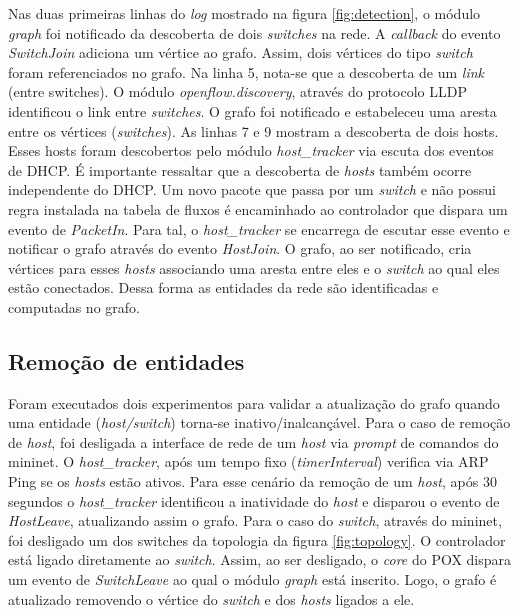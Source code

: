 Nas duas primeiras linhas do \emph{log} mostrado na figura
\ref{fig:detection}, o módulo \emph{graph} foi notificado
da descoberta de dois \emph{switches} na rede.
A \emph{callback} do evento \emph{SwitchJoin} adiciona um vértice ao grafo. 
Assim, dois vértices do tipo \emph{switch} foram referenciados no grafo. 
Na linha 5, nota-se que a descoberta de um \emph{link} (entre switches).
O módulo \emph{openflow.discovery}, através do protocolo LLDP identificou 
o link entre \emph{switches}.
O grafo foi notificado e estabeleceu uma aresta entre os 
vértices (\emph{switches}).
As linhas 7 e 9 mostram a descoberta de dois hosts. 
Esses hosts foram descobertos pelo módulo \emph{host\_tracker} via 
escuta dos eventos de DHCP.
É importante ressaltar que a descoberta de \emph{hosts} também ocorre 
independente do DHCP.
Um novo pacote que passa por um \emph{switch} e não possui regra
instalada na tabela de fluxos é encaminhado ao controlador que 
dispara um evento de \emph{PacketIn}. 
Para tal, o \emph{host\_tracker} se encarrega de escutar esse evento 
e notificar o grafo através do evento \emph{HostJoin}.
O grafo, ao ser notificado, cria vértices para esses \emph{hosts} associando uma
aresta entre eles e o \emph{switch} ao qual eles estão conectados.
Dessa forma as entidades da rede são identificadas e computadas no grafo.

\subsection{Remoção de entidades}
Foram executados dois experimentos para validar a atualização do grafo
quando uma entidade (\emph{host/switch}) torna-se inativo/inalcançável.
Para o caso de remoção de \emph{host}, foi desligada a interface de 
rede de um \emph{host} via \emph{prompt} de comandos do mininet. 
O \emph{host\_tracker}, após um tempo fixo (\emph{timerInterval}) 
verifica via ARP Ping se os \emph{hosts} estão ativos.
Para esse cenário da remoção de um \emph{host}, após 30 segundos o 
\emph{host\_tracker} identificou a inatividade do \emph{host} e 
disparou o evento de \emph{HostLeave}, atualizando assim o grafo.
Para o caso do \emph{switch}, através do mininet, foi desligado um 
dos switches da topologia da figura \ref{fig:topology}.
O controlador está ligado diretamente ao \emph{switch}. 
Assim, ao ser desligado, o \emph{core} do POX dispara um evento 
de \emph{SwitchLeave} ao qual o módulo \emph{graph} está inscrito. 
Logo, o grafo é atualizado removendo o vértice do \emph{switch} e dos
\emph{hosts} ligados a ele. 

